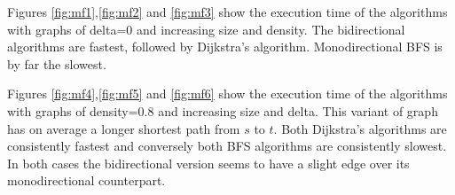 Figures \ref{fig:mf1},\ref{fig:mf2} and \ref{fig:mf3} show the execution time of the algorithms
with graphs of delta=0 and increasing size and density.
The bidirectional algorithms are fastest, followed by Dijkstra's algorithm. Monodirectional BFS is by far the slowest.

Figures \ref{fig:mf4},\ref{fig:mf5} and \ref{fig:mf6} show the execution time of the algorithms
with graphs of density=0.8 and increasing size and delta. This variant of graph has on average a longer shortest path from $s$ to $t$.
Both Dijkstra's algorithms are consistently fastest and conversely both BFS algorithms are consistently slowest.
In both cases the bidirectional version seems to have a slight edge over its monodirectional counterpart.
